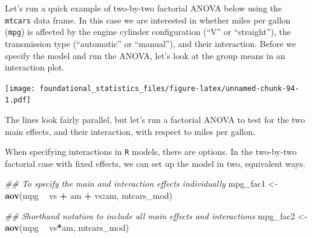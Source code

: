 \documentclass[]{book}
\newenvironment{Shaded}{\begin{snugshade}}{\end{snugshade}}
\newcommand{\CommentTok}[1]{\textcolor[rgb]{0.56,0.35,0.01}{\textit{#1}}}
\newcommand{\DataTypeTok}[1]{\textcolor[rgb]{0.13,0.29,0.53}{#1}}
\newcommand{\DecValTok}[1]{\textcolor[rgb]{0.00,0.00,0.81}{#1}}
\newcommand{\KeywordTok}[1]{\textcolor[rgb]{0.13,0.29,0.53}{\textbf{#1}}}
\newcommand{\NormalTok}[1]{#1}
\newcommand{\OperatorTok}[1]{\textcolor[rgb]{0.81,0.36,0.00}{\textbf{#1}}}
\newcommand{\StringTok}[1]{\textcolor[rgb]{0.31,0.60,0.02}{#1}}
\begin{document}
Let's run a quick example of two-by-two factorial ANOVA below using the \texttt{mtcars} data frame. In this case we are interested in whether miles per gallon (\texttt{mpg}) is affected by the engine cylinder configuration (``V'' or ``straight''), the transmission type (``automatic'' or ``manual''), and their interaction. Before we specify the model and run the ANOVA, let's look at the group means in an interaction plot.

\begin{Shaded}
\end{Shaded}

\texttt{[image: foundational\_statistics\_files/figure-latex/unnamed-chunk-94-1.pdf]}

The lines look fairly parallel, but let's run a factorial ANOVA to test for the two main effects, and their interaction, with respect to miles per gallon.

When specifying interactions in \texttt{R} models, there are options. In the two-by-two factorial case with fixed effects, we can set up the model in two, equivalent ways.

\begin{Shaded}
\begin{Highlighting}[]
\CommentTok{## To specify the main and interaction effects individually}
\NormalTok{mpg_fac1 <-}\StringTok{ }\KeywordTok{aov}\NormalTok{(mpg }\OperatorTok{~}\StringTok{ }\NormalTok{vs }\OperatorTok{+}\StringTok{ }\NormalTok{am }\OperatorTok{+}\StringTok{ }\NormalTok{vs}\OperatorTok{:}\NormalTok{am, mtcars_mod)}

\CommentTok{## Shorthand notation to include all main effects and interactions}
\NormalTok{mpg_fac2 <-}\StringTok{ }\KeywordTok{aov}\NormalTok{(mpg }\OperatorTok{~}\StringTok{ }\NormalTok{vs}\OperatorTok{*}\NormalTok{am, mtcars_mod)}
\end{Highlighting}
\end{Shaded}
\end{document}
